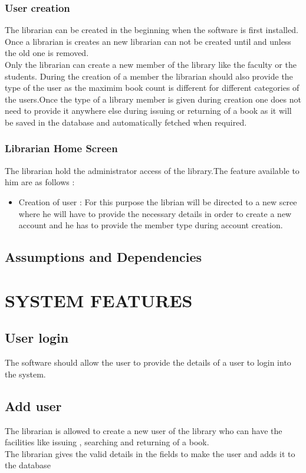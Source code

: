 \documentclass{article}
\begin{document}
\subsubsection*{User creation}
The librarian can be created in the beginning when the software is first installed. Once a librarian is creates an new librarian can not be created until and unless the old one is removed.
\\
Only the librarian can create a new member of the library like the faculty or the students.
During the creation of a member the librarian should also provide the type of the user as the maximim book count is different for different categories of the users.Once the type of a library member is given during creation one does not need to provide it anywhere else during issuing or returning of a book as it will be saved in the database and automatically fetched when required.

\subsubsection*{Librarian Home Screen}
The librarian hold the administrator access of the library.The feature available to him are as follows :
\begin{itemize}
\item Creation of user :
For this purpose the librian will be directed to a new scree where he will have to provide the necessary details in order to create a new account and he has to provide the member type during account creation.
\end{itemize}

\subsection{Assumptions and Dependencies}


\section{SYSTEM FEATURES}
\subsection{User login}
The software should allow the user to provide the details of a user to login into the system.
\subsection{Add user}
The librarian is allowed to create a new user of the library who can have the facilities like issuing , searching and returning of a book.
\\
The librarian gives the valid details in the fields to make the user and adds it to the database
\end{document}
